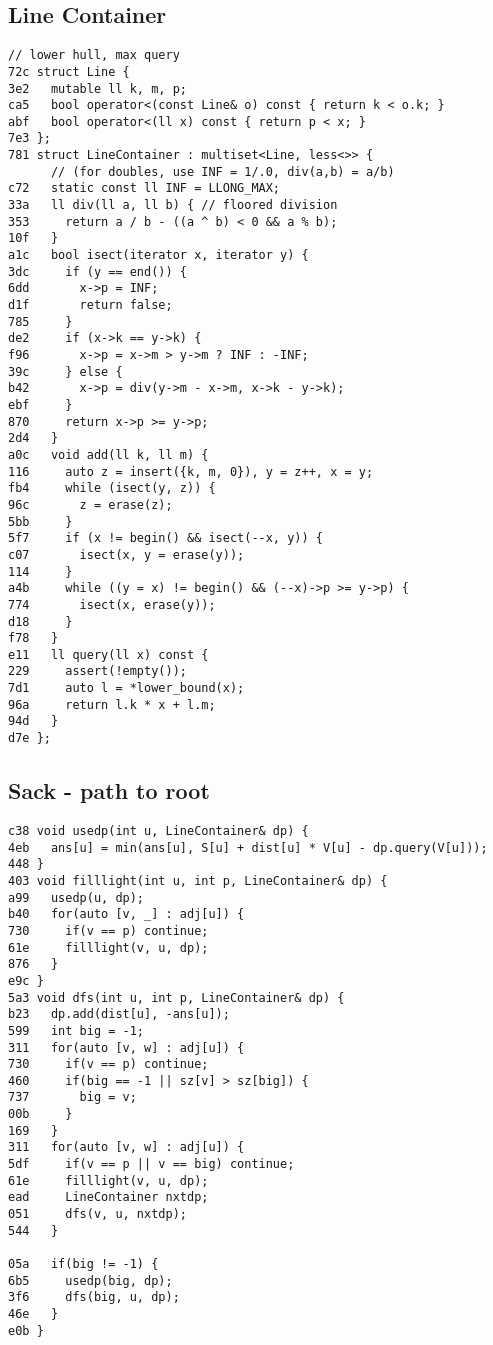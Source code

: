 \documentclass[10pt, a4paper, twoside]{article}
\begin{document}
\subsection{Line Container}
\begin{lstlisting}
// lower hull, max query
72c struct Line {
3e2   mutable ll k, m, p;
ca5   bool operator<(const Line& o) const { return k < o.k; }
abf   bool operator<(ll x) const { return p < x; }
7e3 };
781 struct LineContainer : multiset<Line, less<>> {
      // (for doubles, use INF = 1/.0, div(a,b) = a/b)
c72   static const ll INF = LLONG_MAX;
33a   ll div(ll a, ll b) { // floored division
353     return a / b - ((a ^ b) < 0 && a % b);
10f   }
a1c   bool isect(iterator x, iterator y) {
3dc     if (y == end()) {
6dd       x->p = INF;
d1f       return false;
785     }
de2     if (x->k == y->k) {
f96       x->p = x->m > y->m ? INF : -INF;
39c     } else {
b42       x->p = div(y->m - x->m, x->k - y->k);
ebf     }
870     return x->p >= y->p;
2d4   }
a0c   void add(ll k, ll m) {
116     auto z = insert({k, m, 0}), y = z++, x = y;
fb4     while (isect(y, z)) {
96c       z = erase(z);
5bb     }
5f7     if (x != begin() && isect(--x, y)) {
c07       isect(x, y = erase(y));
114     }
a4b     while ((y = x) != begin() && (--x)->p >= y->p) {
774       isect(x, erase(y));
d18     }
f78   }
e11   ll query(ll x) const {
229     assert(!empty());
7d1     auto l = *lower_bound(x);
96a     return l.k * x + l.m;
94d   }
d7e };
\end{lstlisting}

\subsection{Sack - path to root}
\begin{lstlisting}
c38 void usedp(int u, LineContainer& dp) {
4eb   ans[u] = min(ans[u], S[u] + dist[u] * V[u] - dp.query(V[u])); 
448 }
403 void filllight(int u, int p, LineContainer& dp) {
a99   usedp(u, dp);
b40   for(auto [v, _] : adj[u]) {
730     if(v == p) continue;
61e     filllight(v, u, dp);
876   }
e9c }
5a3 void dfs(int u, int p, LineContainer& dp) {
b23   dp.add(dist[u], -ans[u]);
599   int big = -1;
311   for(auto [v, w] : adj[u]) {
730     if(v == p) continue;
460     if(big == -1 || sz[v] > sz[big]) {
737       big = v;
00b     }
169   }
311   for(auto [v, w] : adj[u]) {
5df     if(v == p || v == big) continue;
61e     filllight(v, u, dp);
ead     LineContainer nxtdp;
051     dfs(v, u, nxtdp);
544   }
     
05a   if(big != -1) {
6b5     usedp(big, dp);
3f6     dfs(big, u, dp);
46e   }
e0b }
\end{lstlisting}
\end{document}
